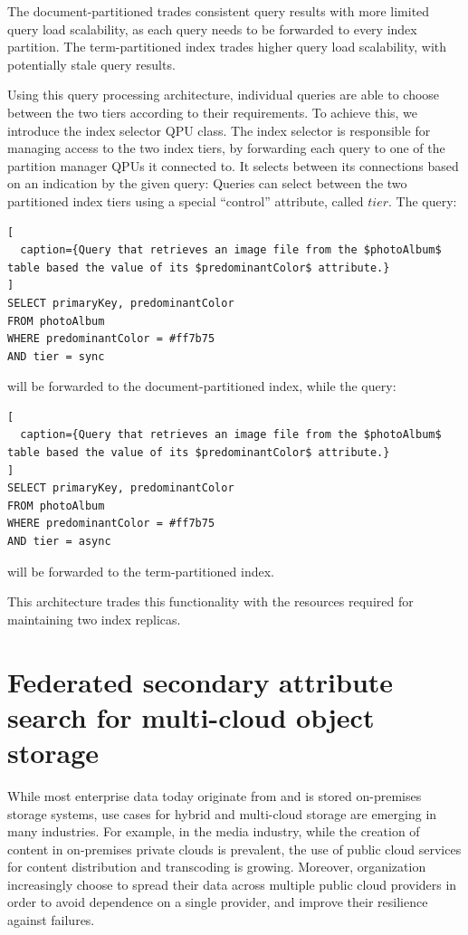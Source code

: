 The document-partitioned trades consistent query results with more limited query load scalability,
as each query needs to be forwarded to every index partition.
The term-partitioned index trades higher query load scalability, with potentially stale query results.

Using this query processing architecture, individual queries are able to choose between the two tiers
according to their requirements.
To achieve this, we introduce the index selector QPU class.
The index selector is responsible for managing access to the two index tiers,
by forwarding each query to one of the partition manager QPUs it connected to.
It selects between its connections based on an indication by the given query:
Queries can select between the two partitioned index tiers using a special ``control'' attribute, called $tier$.
The query:

\begin{lstlisting}[
  caption={Query that retrieves an image file from the $photoAlbum$ table based the value of its $predominantColor$ attribute.}
]
SELECT primaryKey, predominantColor
FROM photoAlbum
WHERE predominantColor = #ff7b75
AND tier = sync
\end{lstlisting}

\noindent
will be forwarded to the document-partitioned index, while the query:

\begin{lstlisting}[
  caption={Query that retrieves an image file from the $photoAlbum$ table based the value of its $predominantColor$ attribute.}
]
SELECT primaryKey, predominantColor
FROM photoAlbum
WHERE predominantColor = #ff7b75
AND tier = async
\end{lstlisting}

\noindent
will be forwarded to the term-partitioned index.

This architecture trades this functionality with the resources required for maintaining
two index replicas.



\section{Federated secondary attribute search for multi-cloud object storage}
\label{sec:zenko}

While most enterprise data today originate from and is stored on-premises storage systems,
use cases for hybrid and multi-cloud storage are emerging in many industries.
For example, in the media industry, while the creation of content in on-premises private clouds is prevalent,
the use of public cloud services for content distribution and transcoding \cite{scality:bloomberg} is growing.
Moreover, organization increasingly choose to spread their data across multiple public cloud providers in order to avoid
dependence on a single provider, and improve their resilience against failures.

